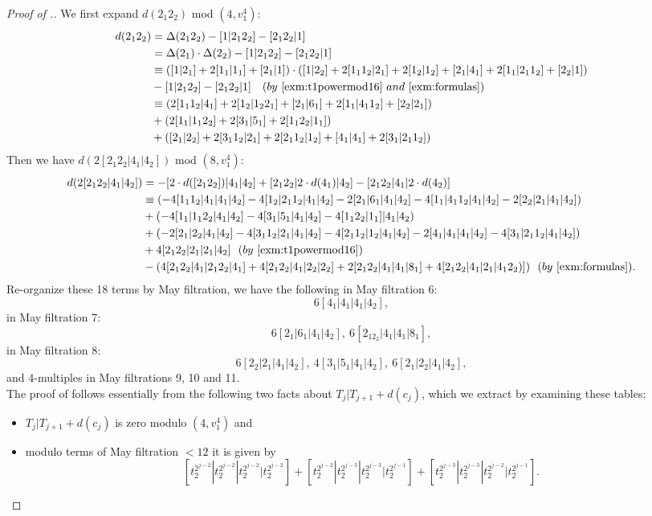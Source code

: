 \begin{proof}[Proof of .]
We first expand $d(2_1 2_2)$ mod $(4, v_1^4)$:
\begin{align*}
d(2_1 2_2) &= \Delta(2_1 2_2) - [1|2_1 2_2] - [2_1 2_2|1]\\
 & = \Delta(2_1) \cdot \Delta(2_2) - [1|2_1 2_2] - [2_1 2_2|1]\\
 & \equiv ([1|2_1] + 2[1_1|1_1] + [2_1|1]) \cdot ([1|2_2] + 2[1_11_2|2_1] + 2[1_2|1_2] + [2_1|4_1]+2[1_1|2_11_2]+[2_2|1])\\
 & - [1|2_1 2_2] - [2_1 2_2|1] \ \ \ (by \ \Cref{exm:t1powermod16} \ and \ \Cref{exm:formulas})\\
 & \equiv (2[1_11_2|4_1] + 2[1_2|1_22_1] + [2_1|6_1]+2[1_1|4_11_2]+[2_2|2_1]) \\
 &+ (2[1_1|1_12_2] + 2[3_1|5_1] + 2[1_12_2|1_1]) \\
 &+ ([2_1|2_2] + 2[3_11_2|2_1] + 2[2_11_2|1_2] + [4_1|4_1]+2[3_1|2_11_2])
\end{align*}
Then we have $d(2[2_1 2_2 | 4_1 | 4_2])$ mod $(8, v_1^4)$:
{\footnotesize
\begin{align*}
d(2[2_1 2_2 | 4_1 | 4_2]) & = - [2\cdot d([2_12_2]) | 4_1 | 4_2] + [2_12_2 | 2\cdot d(4_1) | 4_2] - [2_12_2 | 4_1| 2\cdot d(4_2)] \\
&  \equiv (-4[1_11_2|4_1| 4_1 | 4_2] -4[1_2|2_11_2| 4_1 | 4_2] -2 [2_1|6_1| 4_1 | 4_2]-4[1_1|4_11_2| 4_1 | 4_2]-2[2_2|2_1| 4_1 | 4_2]) \\
 &+ (-4[1_1|1_12_2| 4_1 | 4_2] -4[3_1|5_1| 4_1 | 4_2] -4[1_12_2|1_1]| 4_1 | 4_2) \\
 &+ (-2[2_1|2_2| 4_1 | 4_2] -4[3_11_2|2_1| 4_1 | 4_2] -4[2_11_2|1_2| 4_1 | 4_2] -2 [4_1|4_1| 4_1 | 4_2]-4[3_1|2_11_2| 4_1 | 4_2]) \\
 & + 4[2_12_2 | 2_1|2_1 | 4_2] \ \ (by \ \Cref{exm:t1powermod16})\\
 & - (4[2_12_2 | 4_1| 2_12_2|4_1] + 4[2_12_2 | 4_1| 2_2|2_2] +2[2_12_2 | 4_1| 4_1|8_1]+4[2_12_2 | 4_1| 2_1|4_12_2)]) \ \ (by \ \Cref{exm:formulas}).
\end{align*}}
Re-organize these 18 terms by May filtration, we have the following in May filtration 6:
$$6[4_1|4_1| 4_1 | 4_2],$$
in May filtration 7:
$$6[2_1|6_1| 4_1 | 4_2], \ 6[2_12_2 | 4_1| 4_1|8_1],$$
in May filtration 8:
$$6[2_2|2_1| 4_1 | 4_2], \ 4[3_1|5_1| 4_1 | 4_2], \ 6[2_1|2_2| 4_1 | 4_2],$$
and 4-multiples in May filtrations 9, 10 and 11.\\

  
The proof of  follows essentially from the following two facts about $T_j|T_{j+1} + d(c_j)$, which we extract by examining these tables:
  \begin{itemize}
  \item[(a)] $T_j|T_{j+1} + d(c_j)$ is zero modulo $(4,v_1^4)$ and
  \item[(b)] modulo terms of May filtration $< 12$ it is given by
    \[ [t_2^{2^{j-2}} | t_2^{2^{j-2}} | t_2^{2^{j-2}} | t_2^{2^{j-2}}]
    + [t_2^{2^{j-2}} | t_2^{2^{j-3}} | t_2^{2^{j-3}} | t_2^{2^{j-1}}]
    + [t_2^{2^{j-3}} | t_2^{2^{j-3}} | t_2^{2^{j-2}} | t_2^{2^{j-1}}]. \]
  \end{itemize}
  



\end{proof}

